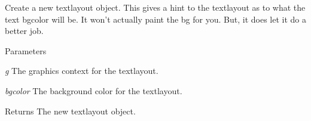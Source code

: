 Create a new textlayout object. This gives a hint to the textlayout as to what the text bgcolor will be. It won't actually paint the bg for you. But, it does let it do a better job.


\begin{DoxyParams}{Parameters}
\item[{\em g}]The graphics context for the textlayout. \item[{\em bgcolor}]The background color for the textlayout. \end{DoxyParams}
\begin{DoxyReturn}{Returns}
The new textlayout object. 
\end{DoxyReturn}
